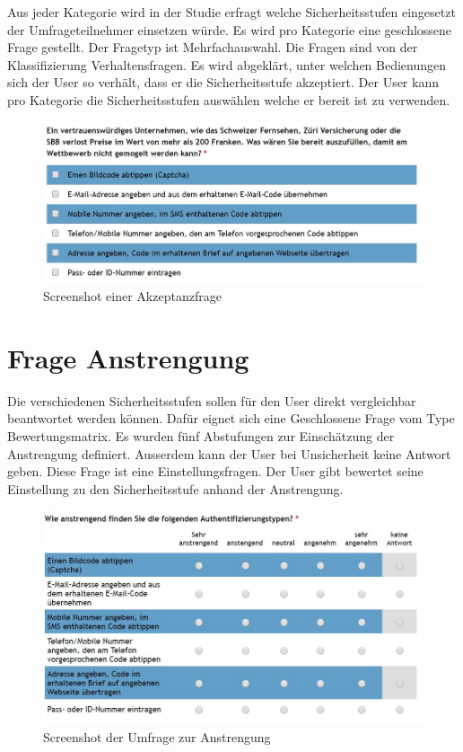 Aus jeder Kategorie wird in der Studie erfragt welche Sicherheitsstufen
eingesetzt der Umfrageteilnehmer einsetzen würde. Es wird pro Kategorie
eine geschlossene Frage gestellt. Der Fragetyp ist Mehrfachauswahl. Die
Fragen sind von der Klassifizierung Verhaltensfragen. Es wird abgeklärt,
unter welchen Bedienungen sich der User so verhält, dass er die
Sicherheitsstufe akzeptiert. Der User kann pro Kategorie die
Sicherheitsstufen auswählen welche er bereit ist zu verwenden.

\begin{figure}[htbp]
\centering
\includegraphics{images/umfrage_aktzeptanz_beispiel.jpg}
\caption{Screenshot einer Akzeptanzfrage}
\end{figure}

\newpage

\section{Frage Anstrengung}\label{frage-anstrengung}

Die verschiedenen Sicherheitsstufen sollen für den User direkt
vergleichbar beantwortet werden können. Dafür eignet sich eine
Geschlossene Frage vom Type Bewertungsmatrix. Es wurden fünf Abstufungen
zur Einschätzung der Anstrengung definiert. Ausserdem kann der User bei
Unsicherheit keine Antwort geben. Diese Frage ist eine
Einstellungsfragen. Der User gibt bewertet seine Einstellung zu den
Sicherheitsstufe anhand der Anstrengung.

\begin{figure}[htbp]
\centering
\includegraphics{images/umfrage_anstrengung.jpg}
\caption{Screenshot der Umfrage zur Anstrengung}
\end{figure}

